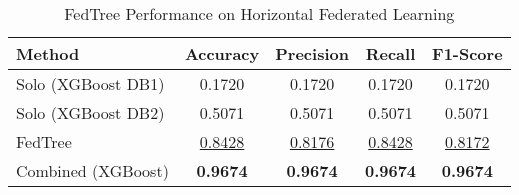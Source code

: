 \begin{table}[ht]
  \centering
  \caption{FedTree Performance on Horizontal Federated Learning}
  \label{tab:fedtree_horizontal_fl}
  \begin{tabular}{lcccc}
  \toprule
  \textbf{Method} & \textbf{Accuracy} & \textbf{Precision} & \textbf{Recall} & \textbf{F1-Score} \\
  \midrule
  Solo (XGBoost DB1) & 0.1720 & 0.1720 & 0.1720 & 0.1720 \\
  Solo (XGBoost DB2) & 0.5071 & 0.5071 & 0.5071 & 0.5071 \\
  \midrule
  FedTree & \underline{0.8428} & \underline{0.8176} & \underline{0.8428} & \underline{0.8172} \\
  \midrule
  Combined (XGBoost) & \textbf{0.9674} & \textbf{0.9674} & \textbf{0.9674} & \textbf{0.9674} \\
  \bottomrule
  \end{tabular}
\end{table}